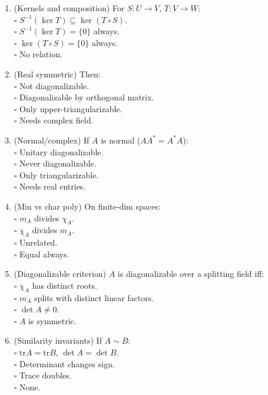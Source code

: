 \documentclass[11pt]{article}
\begin{document}
\begin{enumerate}
\item (Kernels and composition) For $S:U\to V$, $T:V\to W$:\\
\(\square\) $S^{-1}(\ker T)\subseteq \ker(T\circ S)$.\\
\(\square\) $S^{-1}(\ker T)=\{0\}$ always.\\
\(\square\) $\ker(T\circ S)=\{0\}$ always.\\
\(\square\) No relation.

\item (Real symmetric) Then:\\
\(\square\) Not diagonalizable.\\
\(\square\) Diagonalizable by orthogonal matrix.\\
\(\square\) Only upper-triangularizable.\\
\(\square\) Needs complex field.

\item (Normal/complex) If $A$ is normal ($AA^*=A^*A$):\\
\(\square\) Unitary diagonalizable.\\
\(\square\) Never diagonalizable.\\
\(\square\) Only triangularizable.\\
\(\square\) Needs real entries.

\item (Min vs char poly) On finite-dim spaces:\\
\(\square\) $m_A$ divides $\chi_A$.\\
\(\square\) $\chi_A$ divides $m_A$.\\
\(\square\) Unrelated.\\
\(\square\) Equal always.

\item (Diagonalizable criterion) $A$ is diagonalizable over a splitting field iff:\\
\(\square\) $\chi_A$ has distinct roots.\\
\(\square\) $m_A$ splits with distinct linear factors.\\
\(\square\) $\det A\neq 0$.\\
\(\square\) $A$ is symmetric.

\item (Similarity invariants) If $A\sim B$:\\
\(\square\) $\mathrm{tr}A=\mathrm{tr}B$, $\det A=\det B$.\\
\(\square\) Determinant changes sign.\\
\(\square\) Trace doubles.\\
\(\square\) None.


\end{enumerate}
\end{document}
